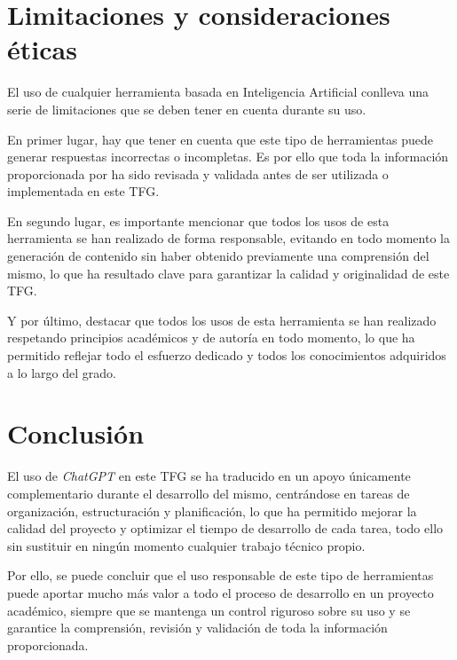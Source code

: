 \section{Limitaciones y consideraciones éticas}
\label{sec:segundaseccion}

El uso de cualquier herramienta basada en Inteligencia Artificial conlleva una serie de limitaciones que se deben tener en cuenta durante su uso.

\vspace{0.25cm}

En primer lugar, hay que tener en cuenta que este tipo de herramientas puede generar respuestas incorrectas o incompletas. Es por ello que toda la información proporcionada por   ha sido revisada y validada antes de ser utilizada o implementada en este TFG.

\vspace{0.25cm}

En segundo lugar, es importante mencionar que todos los usos de esta herramienta se han realizado de forma responsable, evitando en todo momento la generación de contenido sin haber obtenido previamente una comprensión del mismo, lo que ha resultado clave para garantizar la calidad y originalidad de este TFG.

\vspace{0.25cm}

Y por último, destacar que todos los usos de esta herramienta se han realizado respetando principios académicos y de autoría en todo momento, lo que ha permitido reflejar todo el esfuerzo dedicado y todos los conocimientos adquiridos a lo largo del grado.

\section{Conclusión}
\label{sec:segundaseccion}

El uso de \textit{ChatGPT} en este TFG se ha traducido en un apoyo únicamente complementario durante el desarrollo del mismo, centrándose en tareas de organización, estructuración y planificación, lo que ha permitido mejorar la calidad del proyecto y optimizar el tiempo de desarrollo de cada tarea, todo ello sin sustituir en ningún momento cualquier trabajo técnico propio.

\vspace{0.25cm}

Por ello, se puede concluir que el uso responsable de este tipo de herramientas puede aportar mucho más valor a todo el proceso de desarrollo en un proyecto académico, siempre que se mantenga un control riguroso sobre su uso y se garantice la comprensión, revisión y validación de toda la información proporcionada.
